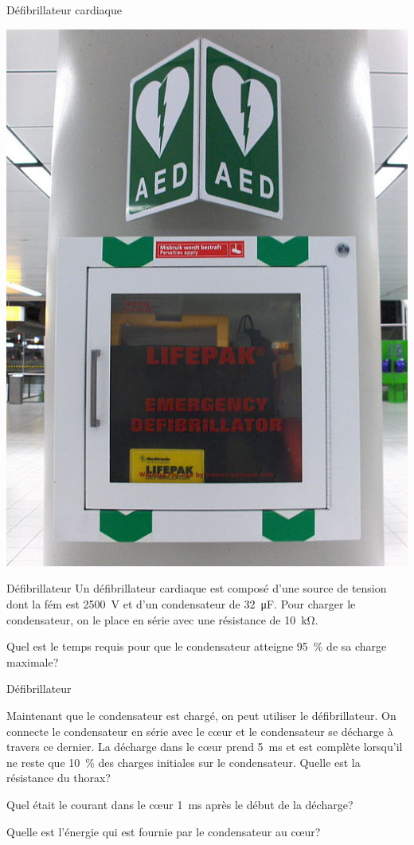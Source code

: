 \documentclass{beamer}
\begin{document}
\begin{frame}{Défibrillateur cardiaque}
  \begin{center}
    \includegraphics{figures/Defibrillator.jpg}
  \end{center}
\end{frame}


\begin{frame}{Défibrillateur}
Un défibrillateur cardiaque est composé d'une source de tension dont la fém est
\SI{2500}{V} et d'un condensateur de \SI{32}{\micro\farad}. Pour charger le
condensateur, on le place en série avec une résistance de \SI{10}{\kilo\ohm}.

Quel est le temps requis pour que le condensateur atteigne \SI{95}{\percent} de
sa charge maximale?

\end{frame}


\begin{frame}{Défibrillateur}

Maintenant que le condensateur est chargé, on peut utiliser le défibrillateur.
On connecte le condensateur en série avec le c\oe ur et le condensateur se
décharge à travers ce dernier. La décharge dans le c\oe ur prend \SI{5}{ms} et
est complète lorsqu'il ne reste que \SI{10}{\percent} des charges initiales
sur le condensateur. Quelle est la résistance du thorax?

Quel était le courant dans le c\oe ur \SI{1}{ms} après le
début de la décharge?

Quelle est l'énergie qui est fournie par le condensateur au c\oe ur?
\end{frame}
\end{document}
